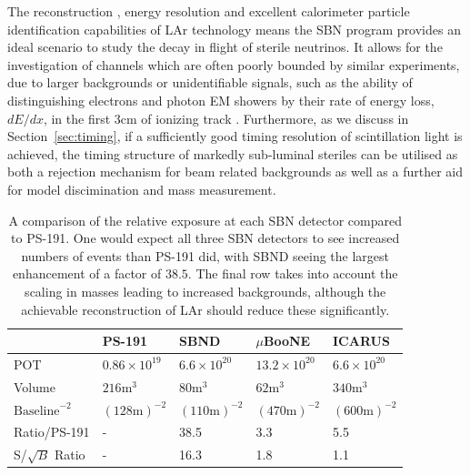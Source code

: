\documentclass[11pt, a4paper]{article}
\newcommand{\refsec}[1]{Section~\ref{#1}}
\begin{document}
The reconstruction \cite{Church:2013hea, Marshall:2015rfa}, energy resolution
\cite{Sorel:2014rka} and excellent calorimeter particle identification
capabilities of LAr \cite{Antonello:2012hu} technology means the SBN program
provides an ideal scenario to study the decay in flight of sterile neutrinos.
It allows for the investigation of channels which are often poorly bounded by
similar experiments, due to larger backgrounds or unidentifiable signals, such
as the ability of distinguishing electrons and photon EM showers by their rate
of energy loss, $dE/dx$, in the first 3cm of ionizing track \cite{szelc:2007}.
Furthermore, as we discuss in \refsec{sec:timing}, if a sufficiently good timing
resolution of scintillation light is achieved, the timing structure of markedly
sub-luminal steriles can be utilised as both a rejection mechanism for beam
related backgrounds as well as a further aid for model discimination and mass
measurement.

\begin{table}[t!]
\centering
\begin{tabular}{| l || l | l | l | l |}
	\hline
	& PS-191 & SBND & $\mu$BooNE & ICARUS \\ \hline \hline
	POT	& $0.86 \times 10^{19}$	& $6.6 \times 10^{20}$	&	$13.2 \times 10^{20}$     &  $6.6 \times 10^{20}$ \\ \hline
	Volume	& $216\text{m}^3$	&	$80\text{m}^3$	&	$62\text{m}^3$	     &   $340\text{m}^3$	\\ \hline
	$\text{Baseline}^{-2}$	& $(128 	\text{m} )^{-2}$	&$(110 \text{m} )^{-2}$	&	$(470 \text{m} )^{-2}$			     & $(600 \text{m} )^{-2}$	  \\ \hline
Ratio/PS-191 & - 	& 38.5 	& 3.3	& 5.5\\ \hline
	S/$\sqrt{B}$ Ratio & - 	& 16.3 	& 1.8	& 1.1\\ \hline
\end{tabular}

\caption{\label{tab:exposure} A comparison of the relative exposure at each SBN detector
compared to PS-191. One would expect all  three SBN detectors to see increased
numbers of events than PS-191 did, with SBND seeing the largest enhancement of a
factor of $38.5$. The final row takes into account the scaling in masses
leading to increased backgrounds, although the achievable reconstruction of LAr
should reduce these significantly.}

\end{table}
\end{document}
